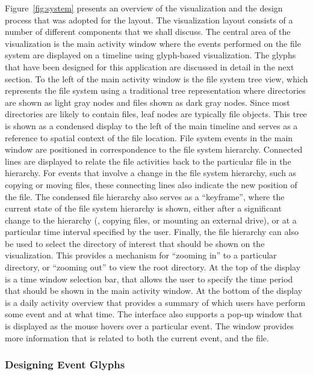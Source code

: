 Figure~\ref{fig:system} presents an overview of the visualization and the design process that was adopted for the layout.
The visualization layout consists of a number of different components that we shall discuss.
The central area of the visualization is the main activity window where the events performed on the file system are displayed on a timeline using glyph-based visualization. 
The glyphs that have been designed for this application are discussed in detail in the next section.
To the left of the main activity window is the file system tree view, which represents the file system using a traditional tree representation where directories are shown as light gray nodes and files shown as dark gray nodes.
Since most directories are likely to contain files, leaf nodes are typically file objects.
This tree is shown as a condensed display to the left of the main timeline and serves as a reference to spatial context of the file location.
File system events in the main window are positioned in correspondence to the file system hierarchy.
Connected lines are displayed to relate the file activities back to the particular file in the hierarchy.
For events that involve a change in the file system hierarchy, such as copying or moving files, these connecting lines also indicate the new position of the file.
The condensed file hierarchy also serves as a ``keyframe'', where the current state of the file system hierarchy is shown, either after a significant change to the hierarchy (\eg, copying files, or mounting an external drive), or at a particular time interval specified by the user.
Finally, the file hierarchy can also be used to select the directory of interest that should be shown on the visualization.
This provides a mechanism for ``zooming in'' to a particular directory, or ``zooming out'' to view the root directory.
At the top of the display is a time window selection bar, that allows the user to specify the time period that should be shown in the main activity window. 
At the bottom of the display is a daily activity overview that provides a summary of which users have perform some event and at what time.
The interface also supports a pop-up window that is displayed as the mouse hovers over a particular event. 
The window provides more information that is related to both the current event, and the file.

\subsubsection{Designing Event Glyphs}

